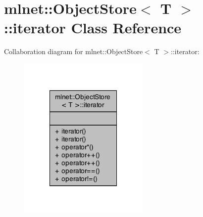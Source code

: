 \hypertarget{classmlnet_1_1_object_store_1_1iterator}{\section{mlnet\+:\+:Object\+Store$<$ T $>$\+:\+:iterator Class Reference}
\label{classmlnet_1_1_object_store_1_1iterator}
}


Collaboration diagram for mlnet\+:\+:Object\+Store$<$ T $>$\+:\+:iterator\+:\nopagebreak
\begin{figure}[H]
\begin{center}
\leavevmode
\includegraphics[width=180pt]{classmlnet_1_1_object_store_1_1iterator__coll__graph}
\end{center}
\end{figure}
